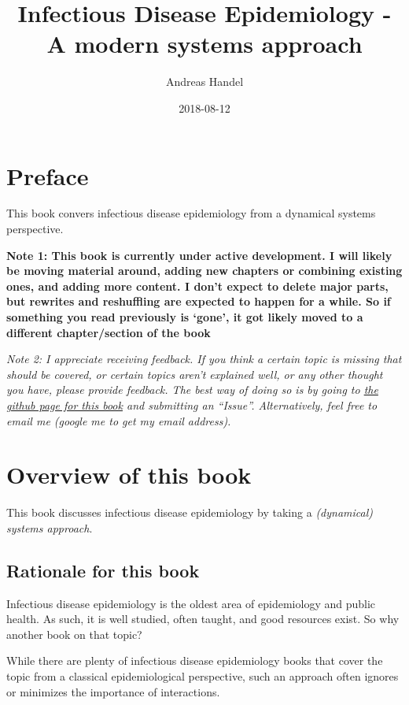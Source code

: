 \documentclass[]{book}
\title{Infectious Disease Epidemiology - A modern systems approach}
\author{Andreas Handel}
\date{2018-08-12}
\theoremstyle{definition}
\theoremstyle{definition}
\theoremstyle{definition}
\theoremstyle{remark}
\begin{document}
\maketitle

{
\setcounter{tocdepth}{1}
\tableofcontents
}
\chapter*{Preface}\label{preface}

This book convers infectious disease epidemiology from a dynamical
systems perspective.

\textbf{Note 1: This book is currently under active development. I will
likely be moving material around, adding new chapters or combining
existing ones, and adding more content. I don't expect to delete major
parts, but rewrites and reshuffling are expected to happen for a while.
So if something you read previously is `gone', it got likely moved to a
different chapter/section of the book}

\emph{Note 2: I appreciate receiving feedback. If you think a certain
topic is missing that should be covered, or certain topics aren't
explained well, or any other thought you have, please provide feedback.
The best way of doing so is by going to
\href{https://github.com/ahgroup/DSAIDEbook}{the github page for this
book} and submitting an ``Issue''. Alternatively, feel free to email me
(google me to get my email address).}

\chapter{Overview of this book}\label{overview-of-this-book}

This book discusses infectious disease epidemiology by taking a
\emph{(dynamical) systems approach}.

\section{Rationale for this book}\label{rationale-for-this-book}

Infectious disease epidemiology is the oldest area of epidemiology and
public health. As such, it is well studied, often taught, and good
resources exist. So why another book on that topic?

While there are plenty of infectious disease epidemiology books that
cover the topic from a classical epidemiological perspective, such an
approach often ignores or minimizes the importance of interactions.
\end{document}
